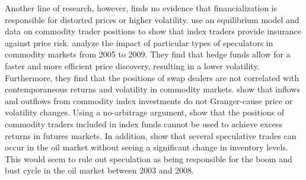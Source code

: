 Another line of research, however, finds no evidence that financialization is responsible for distorted prices or higher volatility. \citet*{brunetti2014commodity} use an equilibrium model and data on commodity trader positions to show that index traders provide insurance against price risk.     \citet*{brunetti2016speculators}  analyze the impact of particular types of speculators in commodity markets from 2005 to 2009. They find that hedge funds allow for a faster and more efficient price discovery, resulting in a lower volatility. Furthermore, they find that the positions of swap dealers are not correlated with contemporaneous returns and volatility in commodity markets.  
\citet*{stoll2010commodity} show that inflows and outflows from commodity index investments do not Granger-cause price or volatility changes. Using a no-arbitrage argument, \citet*{hamilton2014risk} show that the positions of commodity traders included in index funds cannot be used to achieve excess returns in futures markets. In addition, \citet*{kilian2014role} show that several speculative trades can occur in the oil market without seeing a significant change in inventory levels. This would seem to rule out speculation as being responsible for the boom and bust cycle in the oil market between 2003 and 2008. %




